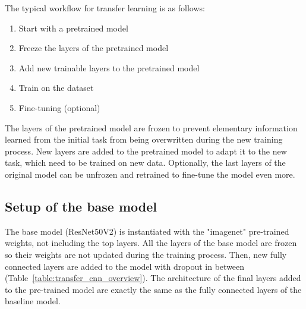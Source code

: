 \documentclass[conference]{IEEEtran}
\begin{document}
The typical workflow for transfer learning is as follows:
\begin{enumerate}
	\item Start with a pretrained model
	\item Freeze the layers of the pretrained model
	\item Add new trainable layers to the pretrained model
	\item Train on the dataset
	\item Fine-tuning (optional)
\end{enumerate}
\vspace{0.5cm}

The layers of the pretrained model are frozen to prevent elementary information learned from the initial task from being overwritten during the new training process. New layers are added to the pretrained model to adapt it to the new task, which need to be trained on new data. Optionally, the last layers of the original model can be unfrozen and retrained to fine-tune the model even more.

\subsection{Setup of the base model}
The base model (ResNet50V2) is instantiated with the "imagenet" pre-trained weights, not including the top layers. All the layers of the base model are frozen so their weights are not updated during the training process. Then, new fully connected layers are added to the model with dropout in between (Table~\ref{table:transfer_cnn_overview}). The architecture of the final layers added to the pre-trained model are exactly the same as the fully connected layers of the baseline model.
\end{document}
